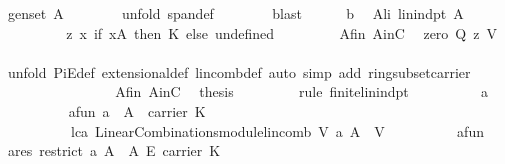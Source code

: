 \begin{isabellebody}
\ {\isachardoublequoteopen}gen{\isacharunderscore}set\ A{\isachardoublequoteclose}\isanewline
\ \ \ \ \ \ \isamarkupfalse%
\ {\isacharparenleft}unfold\ span{\isacharunderscore}def{\isacharparenright}\isanewline
\ \ \ \ \ \ \isamarkupfalse%
\ blast\isanewline
\ \ \ \ \isamarkupfalse%
\ b{}\ \isamarkupfalse%
\ A{\isacharunderscore}li{\isacharcolon}\ {\isachardoublequoteopen}lin{\isacharunderscore}indpt\ A{\isachardoublequoteclose}\isanewline
\ \ \ \ \isamarkupfalse%
\ {\isacharminus}\isanewline
\ \ \ \ \ \ \isamarkupfalse%
\ {\isacharquery}z{\isacharequal}{\isachardoublequoteopen}{\isasymlambda}\ x{\isachardot}\ {\isacharparenleft}if\ {\isacharparenleft}x{\isasymin}A{\isacharparenright}\ then\ {\isasymzero}\isactrlbsub K\isactrlesub \ else\ undefined{\isacharparenright}{\isachardoublequoteclose}\ \isanewline
\ \ \ \ \ \ \isamarkupfalse%
\ A{\isacharunderscore}fin\ AinC\ \isamarkupfalse%
\ zero{\isacharcolon}\ {\isachardoublequoteopen}{\isacharquery}Q\ {\isacharquery}z\ {\isasymzero}\isactrlbsub V\isactrlesub {\isachardoublequoteclose}\ \isanewline
\ \ \ \ \ \ \ \ \isamarkupfalse%
\ {\isacharparenleft}unfold\ PiE{\isacharunderscore}def\ extensional{\isacharunderscore}def\ lincomb{\isacharunderscore}def{\isacharcomma}\ auto\ simp\ add{\isacharcolon}\ ring{\isacharunderscore}subset{\isacharunderscore}carrier{\isacharparenright}\isanewline
\ \ \ \ \ \ \ \ \isanewline
\ \ \ \ \ \ \isamarkupfalse%
\ A{\isacharunderscore}fin\ AinC\ \isamarkupfalse%
\ {\isacharquery}thesis\ \isanewline
\ \ \ \ \ \ \isamarkupfalse%
\ {\isacharparenleft}rule\ finite{\isacharunderscore}lin{\isacharunderscore}indpt{}{\isacharparenright}\isanewline
\ \ \ \ \ \ \ \ \isamarkupfalse%
\ a\isanewline
\ \ \ \ \ \ \ \ \isamarkupfalse%
\ a{\isacharunderscore}fun{\isacharcolon}\ {\isachardoublequoteopen}a\ {\isasymin}\ A\ {\isasymrightarrow}\ carrier\ K{\isachardoublequoteclose}\ \isanewline
\ \ \ \ \ \ \ \ \ \ lc{\isacharunderscore}a{\isacharcolon}\ {\isachardoublequoteopen}LinearCombinations{\isachardot}module{\isachardot}lincomb\ V\ a\ A\ {\isacharequal}\ {\isasymzero}\isactrlbsub V\isactrlesub {\isachardoublequoteclose}\isanewline
\ \ \ \ \ \ \ \ \isamarkupfalse%
\ a{\isacharunderscore}fun\ \isamarkupfalse%
\ a{\isacharunderscore}res{\isacharcolon}\ {\isachardoublequoteopen}restrict\ a\ A\ {\isasymin}\ A\ {\isasymrightarrow}\isactrlsub E\ carrier\ K{\isachardoublequoteclose}\ \isamarkupfalse%

\end{isabellebody}
